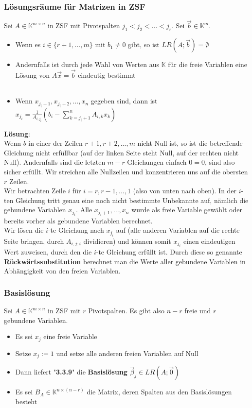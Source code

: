 \documentclass[titlepage]{article}
\newcommand{\K}{\mathbb{K}}
\newcommand{\1}{\mathbb{1}}
\newcommand{\0}{\mathbb{0}}
\begin{document}
				\subsubsection{Lösungsräume für Matrizen in ZSF}
					Sei $A\in\K^{m\times n}$ in ZSF mit Pivotspalten $j_1<j_2<...<j_r$. Sei $\vec{b}\in\K^m$.
					\begin{itemize}
						\item Wenn es $i\in\{r+1,...,m\}$ mit $b_1\neq0$ gibt, so ist $LR(A;\vec{b})=\emptyset$
						\item Andernfalls ist durch jede Wahl von Werten aus $\K$ für die freie Variablen eine Lösung von $A\vec{x}=\vec{b}$ eindeutig bestimmt\\\\
						\item Wenn $x_{j_i+1},x_{j_i+2},...,x_n$ gegeben sind, dann ist $x_{j_i}=\frac{1}{A_{i,j_i}}\left(b_i-\sum\limits^n_{k=j_i+1}A_{i,k}x_k\right)$
					\end{itemize}
					\textbf{Lösung}:\\
					Wenn $b$ in einer der Zeilen $r+1,r+2,...,m$ nicht Null ist, so ist die betreffende Gleichung nicht erfüllbar (auf der linken Seite steht Null, auf der rechten nicht Null). Andernfalls sind die letzten $m-r$ Gleichungen einfach $0=0$, sind also sicher erfüllt. Wir streichen alle Nullzeilen und konzentrieren uns auf die obersten $r$ Zeilen.\\
					Wir betrachten Zeile $i$ für $i=r,r-1,...,1$ (also von unten nach oben). In der $i$-ten Gleichung tritt genau eine noch nicht bestimmte Unbekannte auf, nämlich die gebundene Variablen $x_{j_i}$. Alle $x_{j_i+1},...,x_n$ wurde als freie Variable gewählt oder bereits vorher als gebundene Variablen berechnet.\\
					Wir lösen die $i$-te Gleichung nach $x_{j_i}$ auf (alle anderen Variablen auf die rechte Seite bringen, durch $A_{i,j:i}$ dividieren) und können somit $x_{j_i}$ einen eindeutigen Wert zuweisen, durch den die $i$-te Gleichung erfüllt ist. Durch diese so genannte \textbf{Rückwärtssubstitution} berechnet man die Werte aller gebundene Variablen in Abhängigkeit von den freien Variablen.
				\subsubsection{Basislösung}
					Sei $A\in\K^{m\times n}$ in ZSF mit $r$ Pivotspalten. Es gibt also $n-r$ freie und $r$ gebundene Variablen.
					\begin{itemize}
						\item Es sei $x_j$ eine freie Variable
						\item Setze $x_j:=1$ und setze alle anderen freien Variablen auf Null
						\item Dann liefert "\textbf{3.3.9}" die \textbf{Basislösung} $\vec{\beta}_j\in LR(A;\vec{0})$
						\item Es sei $B_A\in\K^{n\times(n-r)}$ die Matrix, deren Spalten aus den Basislösungen besteht
					\end{itemize}
\end{document}

